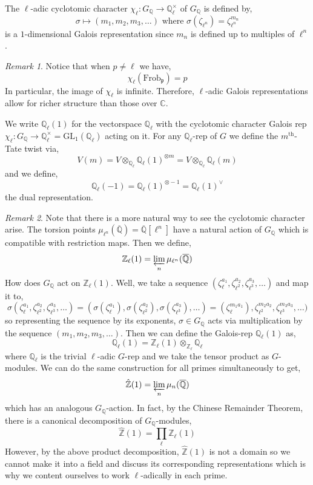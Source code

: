 \documentclass[12pt]{article}
\newcommand{\Z}{\mathbb{Z}}
\newcommand{\C}{\mathbb{C}}
\newcommand{\Q}{\mathbb{Q}}
\newcommand{\GL}[2]{\mathrm{GL}_{#1}(#2)}
\newcommand{\Frob}[0]{\mathrm{Frob}}
\newcommand{\Frobp}{\Frob_{\mathfrak{p}}}
\theoremstyle{remark}
\newtheorem*{remark}{Remark}
\theoremstyle{definition}
\newenvironment{definition}[1][Definition:]{\begin{trivlist}
\item[\hskip \labelsep {\bfseries #1}]}{\end{trivlist}}
\begin{document}
\begin{definition}
The $\ell$-adic cyclotomic character $\chi_{\ell} : G_\Q \to \Q_{\ell}^\times$ of $G_\Q$ is defined by, 
\[ \sigma \mapsto (m_1, m_2, m_3, \dots ) \text{ where } \sigma(\zeta_{\ell^n}) = \zeta_{\ell^n}^{m_n} \]
is a $1$-dimensional Galois representation since $m_n$ is defined up to multiples of $\ell^n$.
\end{definition}

\begin{remark}
Notice that when $p \neq \ell$ we have,
\[\chi_{\ell}(\Frobp) = p\]
In particular, the image of $\chi_{\ell}$ is infinite. Therefore, $\ell$-adic Galois representations allow for richer structure than those over $\C$. 
\end{remark}

\begin{definition}
We write $\Q_\ell(1)$ for the vectorspace $\Q_\ell$ with the cyclotomic character Galois rep $\chi_\ell : G_\Q \to \Q_\ell^\times = \GL{1}{\Q_\ell}$ acting on it. For any $\Q_\ell$-rep of $G$ we define the $m^{\text{th}}$-Tate twist via,
\[ V(m) = V \otimes_{\Q_\ell} \Q_\ell(1)^{\otimes m} = V \otimes_{\Q_\ell} \Q_\ell(m) \]
and we define,
\[ \Q_\ell(-1) = \Q_\ell(1)^{\otimes -1} = \Q_{\ell}(1)^\vee \]
the dual representation.
\end{definition}

\begin{remark}
Note that there is a more natural way to see the cyclotomic character arise. The torsion points $\mu_{\ell^n}(\overline{\Q}) = \overline{\Q}[\ell^n]$ have a natural action of $G_{\Q}$ which is compatible with restriction maps. Then we define,
\[ \Z_\ell(1) = \varprojlim_{n} \mu_{\ell^n}(\overline{\Q}) \]
How does $G_\Q$ act on $\Z_\ell(1)$. Well, we take a sequence $(\zeta_\ell^{a_1}, \zeta_{\ell^2}^{a_2}, \zeta_{\ell^3}^{a_3}, \dots )$ and map it to,
\[ \sigma(\zeta_\ell^{a_1}, \zeta_{\ell^2}^{a_2}, \zeta_{\ell^3}^{a_3}, \dots ) = (\sigma(\zeta_\ell^{a_1}), \sigma(\zeta_{\ell^2}^{a_2}), \sigma(\zeta_{\ell^3}^{a_3}), \dots ) = (\zeta_\ell^{m_1 a_1}), \zeta_{\ell^2}^{m_2 a_2}, \zeta_{\ell^3}^{m_3 a_3},  \dots ) \]
so representing the sequence by its exponents, $\sigma \in G_\Q$ acts via multiplication by the sequence $(m_1, m_2, m_3, \dots)$. Then we can define the Galois-rep $\Q_\ell(1)$ as,
\[ \Q_\ell(1) = \Z_\ell(1) \otimes_{\Z_\ell} \Q_\ell \]
where $\Q_\ell$ is the trivial $\ell$-adic $G$-rep and we take the tensor product as $G$-modules. We can do the same construction for all primes simultaneously to get,
\[ \hat{\Z}(1) = \varprojlim_n \mu_n(\overline{\Q}) \]
which has an analogous $G_\Q$-action. In fact, by the Chinese Remainder Theorem, there is a canonical decomposition of $G_\Q$-modules,
\[ \hat{\Z}(1) = \prod_{\ell} \Z_\ell(1) \]
However, by the above product decomposition, $\hat{\Z}(1)$ is not a domain so we cannot make it into a field and discuss its corresponding representations which is why we content ourselves to work $\ell$-adically in each prime.
\end{remark}
\end{document}
